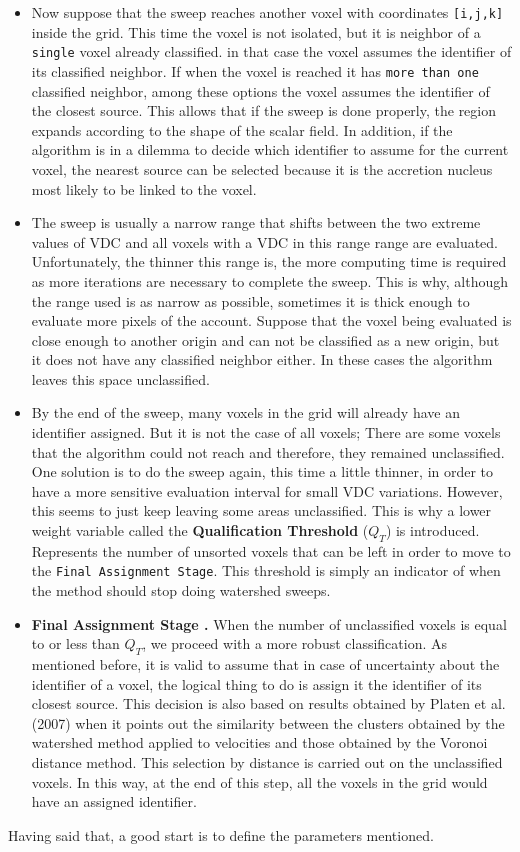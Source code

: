 \begin{itemize}
    \item Now suppose that the sweep reaches another voxel with coordinates \texttt{[i,j,k]} inside the grid. This time the voxel is not isolated, but it is neighbor of a \texttt{single} voxel already classified. in that case the voxel assumes the identifier of its classified neighbor. If when the voxel is reached it has \texttt{more than one} classified neighbor, among these options the voxel assumes the identifier of the closest source. This allows that if the sweep is done properly, the region expands according to the shape of the scalar field. In addition, if the algorithm is in a dilemma to decide which identifier to assume for the current voxel, the nearest source can be selected because it is the accretion nucleus most likely to be linked to the voxel.
    \item The sweep is usually a narrow range that shifts between the two extreme values of VDC and all voxels with a VDC in this range range are evaluated. Unfortunately, the thinner this range is, the more computing time is required as more iterations are necessary to complete the sweep. This is why, although the range used is as narrow as possible, sometimes it is thick enough to evaluate more pixels of the account. Suppose that the voxel being evaluated is close enough to another origin and can not be classified as a new origin, but it does not have any classified neighbor either. In these cases the algorithm leaves this space unclassified.
    \item By the end of the sweep, many voxels in the grid will already have an identifier assigned. But it is not the case of all voxels; There are some voxels that the algorithm could not reach and therefore, they remained unclassified. One solution is to do the sweep again, this time a little thinner, in order to have a more sensitive evaluation interval for small VDC variations. However, this seems to just keep leaving some areas unclassified. This is why a lower weight variable called the \textbf{Qualification Threshold} ($Q_T$) is introduced. Represents the number of unsorted voxels that can be left in order to move to the \texttt{Final Assignment Stage}. This threshold is simply an indicator of when the method should stop doing watershed sweeps.
    \item \textbf{Final Assignment Stage .} When the number of unclassified voxels is equal to or less than $Q_T$, we proceed with a more robust classification. As mentioned before, it is valid to assume that in case of uncertainty about the identifier of a voxel, the logical thing to do is assign it the identifier of its closest source. This decision is also based on results obtained by Platen et al. (2007)\cite{CosmicWatershedVoidDetection} when it points out the similarity between the clusters obtained by the watershed method applied to velocities and those obtained by the Voronoi distance method. This selection by distance is carried out on the unclassified voxels. In this way, at the end of this step, all the voxels in the grid would have an assigned identifier.
\end{itemize}
Having said that, a good start is to define the parameters mentioned.

